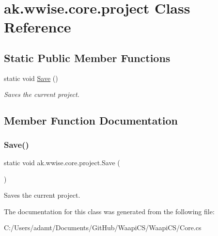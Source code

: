 \hypertarget{classak_1_1wwise_1_1core_1_1project}{}\section{ak.\+wwise.\+core.\+project Class Reference}
\label{classak_1_1wwise_1_1core_1_1project}
\subsection*{Static Public Member Functions}
\begin{DoxyCompactItemize}
\item 
static void \mbox{\hyperlink{classak_1_1wwise_1_1core_1_1project_aaa560de84f01baa4885c170bb8a42eae}{Save}} ()
\begin{DoxyCompactList}\small\item\em Saves the current project. \end{DoxyCompactList}\end{DoxyCompactItemize}


\subsection{Member Function Documentation}
\mbox{\label{classak_1_1wwise_1_1core_1_1project_aaa560de84f01baa4885c170bb8a42eae}} 
\subsubsection{\texorpdfstring{Save()}{Save()}}
{\footnotesize\ttfamily static void ak.\+wwise.\+core.\+project.\+Save (\begin{DoxyParamCaption}{ }\end{DoxyParamCaption})\hspace{0.3cm}{\ttfamily [static]}}



Saves the current project. 



The documentation for this class was generated from the following file\+:\begin{DoxyCompactItemize}
\item 
C\+:/\+Users/adamt/\+Documents/\+Git\+Hub/\+Waapi\+C\+S/\+Waapi\+C\+S/Core.\+cs\end{DoxyCompactItemize}
